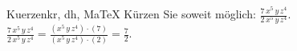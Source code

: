 \begin{MAufgabe}{Kuerzen}{kr, dh, MaTeX}
K\"urzen Sie soweit m\"oglich: $\frac{7\, x^5\, y\, z^4}{2\, x^5\, y\, z^4}$.\\ 
\ifLsg\MLoesung
\quad $\frac{7\, x^5\, y\, z^4}{2\, x^5\, y\, z^4}=\frac{(x^5\, y\, z^4)\cdot(7)}{(x^5\, y\, z^4)\cdot(2)}=\frac{7}{2}$.\else\relax\fi
 \end{MAufgabe}